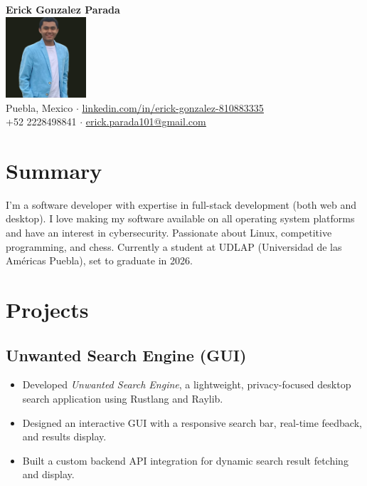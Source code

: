 \documentclass[a4paper,10pt]{article}
\begin{document}
\begin{center}
    {\LARGE \textbf{Erick Gonzalez Parada}} \\
    \vspace{0.3cm}
    \includegraphics[width=3cm]{decentppic.jpeg} \\
    \vspace{0.3cm}
    Puebla, Mexico $\cdot$ \underline{\href{https://linkedin.com/in/erick-gonzalez-810883335}{linkedin.com/in/erick-gonzalez-810883335}} \\
    +52 2228498841 $\cdot$ \underline{\href{mailto:erick.parada101@gmail.com}{erick.parada101@gmail.com}}
\end{center}



\section*{Summary}
I'm a software developer with expertise in full-stack development (both web and desktop). I love making my software available on all operating system platforms and have an interest in cybersecurity. Passionate about Linux, competitive programming, and chess. Currently a student at UDLAP (Universidad de las Américas Puebla), set to graduate in 2026.

\section*{Projects}
\subsection*{Unwanted Search Engine (GUI)}
\begin{itemize}
    \item Developed \textit{Unwanted Search Engine}, a lightweight, privacy-focused desktop search application using Rustlang and Raylib.
    \item Designed an interactive GUI with a responsive search bar, real-time feedback, and results display.
    \item Built a custom backend API integration for dynamic search result fetching and display.
\end{itemize}
\end{document}
